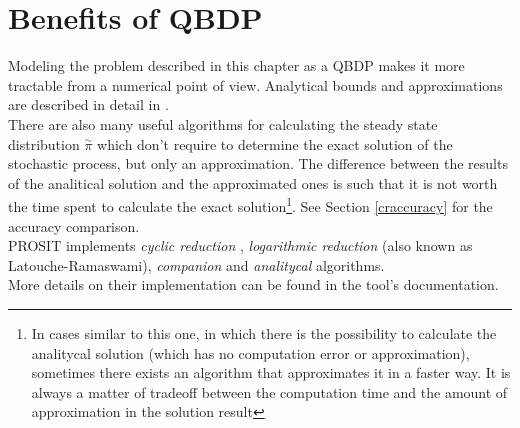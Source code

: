 \section{Benefits of QBDP} \label{benefits}
Modeling the problem described in this chapter as a QBDP makes it more tractable from a numerical point of view. Analytical bounds and approximations are described in detail in \cite{probGuarantees}.\\
There are also many useful algorithms for calculating the steady state distribution \( \overset{\sim}{\pi} \) which don't require to determine the exact solution of the stochastic process, but only an approximation. The difference between the results of the analitical solution and the approximated ones is such that it is not worth the time spent to calculate the exact solution\footnote{In cases similar to this one, in which there is the possibility to calculate the analitycal solution (which has no computation error or approximation), sometimes there exists an algorithm that approximates it in a faster way. It is always a matter of tradeoff between the computation time and the amount of approximation in the solution result}. See Section \ref{craccuracy} for the accuracy comparison.\\
PROSIT implements \emph{cyclic reduction} \cite{cyclic}, \emph{logarithmic reduction} \cite{latouche} (also known as Latouche-Ramaswami), \emph{companion} \cite{probGuarantees} and \emph{analitycal} \cite{probGuarantees} algorithms.\\
More details on their implementation can be found in the tool's documentation.
